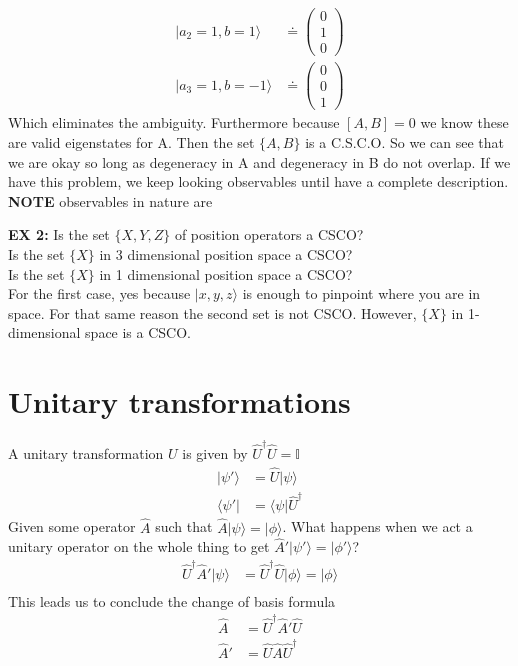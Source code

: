 \documentclass[a4paper, 11pt]{article}
\newcommand{\ket}[1]{|#1\rangle}
\newcommand{\bra}[1]{\langle #1 |}
\newenvironment{solution}{%
	\begin{list}{}{%
			\setlength{\topsep}{0pt}%
			\setlength{\leftmargin}{1.5cm}%
			\setlength{\rightmargin}{1.5cm}%
			\setlength{\listparindent}{\parindent}%
			\setlength{\itemindent}{\parindent}%
			\setlength{\parsep}{\parskip}%
		}%
		\item[]}{\end{list}}
\begin{document}
\begin{solution}
\begin{align*}
				\ket{a_2=1, b=1} &\doteq \begin{pmatrix}0 \\ 1 \\ 0 \end{pmatrix}\\
				\ket{a_3=1, b=-1} &\doteq \begin{pmatrix}0 \\ 0 \\ 1 \end{pmatrix}
				\end{align*}
			Which eliminates the ambiguity. Furthermore because $[A,B]=0$ we know these are valid eigenstates for A. Then the set $\{A,B\}$ is a C.S.C.O. So we can see that we are okay so long as degeneracy in A and degeneracy in B do not overlap. If we have this problem, we keep looking observables until have a complete description. \textbf{NOTE} observables in nature are 
		\end{solution}
		\begin{solution}
			\noindent\textbf{EX 2:} Is the set $\{X,Y,Z\}$ of position operators a CSCO?\\ 
			\noindent Is the set $\{X\}$ in 3 dimensional position space a CSCO? \\ 
			\noindent Is the set $\{X\}$ in 1 dimensional position space a CSCO? \\ 
			
			\noindent For the first case, yes because $\ket{x, y, z}$ is enough to pinpoint where you are in space. For that same reason the second set is not CSCO. However, $\{X\}$ in 1-dimensional space is a CSCO. 
		\end{solution}
	
\section*{Unitary transformations} 
	\noindent A unitary transformation $U$ is given by $\hat{U}^\dagger\hat{U}=\mathbb{I}$
		\begin{align*}
			\ket{\psi'} &= \hat{U}\ket{\psi} \\ 
			\bra{\psi'} &= \bra{\psi}\hat{U}^\dagger
		\end{align*}
	Given some operator $\hat{A}$ such that $\hat{A}\ket{\psi}=\ket{\phi}$. What happens when we act a unitary operator on the whole thing to get $\hat{A}'\ket{\psi'}=\ket{\phi'}$? 
		\begin{align*}
			\hat{U}^\dagger \hat{A}'\ket{\psi} &= \hat{U}^\dagger\hat{U}\ket{\phi} = \ket{\phi}\\ 
		\end{align*}
	This leads us to conclude the change of basis formula
		\begin{align*}
			\hat{A}  &= \hat{U}^\dagger\hat{A}'\hat{U} \\ 
			\hat{A}' &= \hat{U}\hat{A}\hat{U}^\dagger
		\end{align*}
\end{document}
